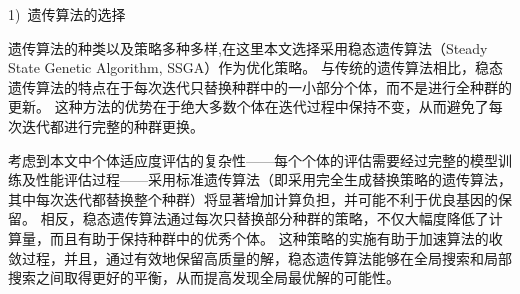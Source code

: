 1)~遗传算法的选择\par
遗传算法的种类以及策略多种多样,在这里本文选择采用稳态遗传算法（Steady State Genetic Algorithm, SSGA）作为优化策略。
与传统的遗传算法相比，稳态遗传算法的特点在于每次迭代只替换种群中的一小部分个体，而不是进行全种群的更新。
这种方法的优势在于绝大多数个体在迭代过程中保持不变，从而避免了每次迭代都进行完整的种群更换。\par

考虑到本文中个体适应度评估的复杂性——每个个体的评估需要经过完整的模型训练及性能评估过程——采用标准遗传算法（即采用完全生成替换策略的遗传算法，其中每次迭代都替换整个种群）将显著增加计算负担，并可能不利于优良基因的保留。
相反，稳态遗传算法通过每次只替换部分种群的策略，不仅大幅度降低了计算量，而且有助于保持种群中的优秀个体。
这种策略的实施有助于加速算法的收敛过程，并且，通过有效地保留高质量的解，稳态遗传算法能够在全局搜索和局部搜索之间取得更好的平衡，从而提高发现全局最优解的可能性。\par

